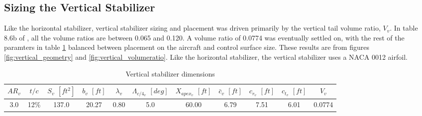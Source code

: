 \documentclass[conf]{new-aiaa}
\begin{document}
\subsection{Sizing the Vertical Stabilizer}

Like the horizontal stabilizer, vertical stabilizer sizing and placement was driven primarily by the vertical tail volume ratio, $V_v$. In table 8.6b of \cite{orange_book}, all the volume ratios are between 0.065 and 0.120. A volume ratio of 0.0774 was eventually settled on, with the rest of the paramters in table \ref{tab:vertical_stabilizer_size} balanced between placement on the aircraft and control surface size. These results are from figures \ref{fig:vertical_geometry} and \ref{fig:vertical_volumeratio}. Like the horizontal stabilizer, the vertical stabilizer uses a NACA 0012 airfoil.

\begin{table}[H]
\centering
\caption{Vertical stabilizer dimensions}
\begin{tabular}{|c|c|c|c|c|c|c|c|c|c|c|}\hline
    $AR_v$ & $t/c$ & $S_v$ $[ft^2]$ & $b_v$ $[ft]$ & $\lambda_v$ & $\Lambda_{c/4_v}$ $[deg]$ & $X_{apex_v}$ $[ft]$ & $\bar{c}_v$ $[ft]$ & $c_{r_v}$ $[ft]$ & $c_{t_v}$ $[ft]$ & $V_v$ \\ \hline
    3.0 & 12\% & 137.0 & 20.27 & 0.80 & 5.0  & 60.00 & 6.79 & 7.51 & 6.01 & 0.0774 \\ \hline
\end{tabular}
\label{tab:vertical_stabilizer_size}
\end{table}
\end{document}
